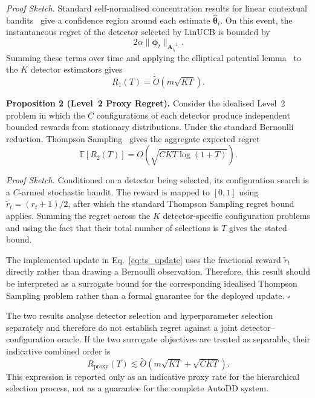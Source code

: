 \documentclass[conference]{IEEEtran}
\begin{document}
\textit{Proof Sketch.}
Standard self-normalised concentration results for linear contextual bandits~\cite{Abbasi2011Improved} give a confidence region around each estimate $\hat{\boldsymbol{\theta}}_i$. On this event, the instantaneous regret of the detector selected by LinUCB is bounded by
\begin{equation}
2\alpha
\|\boldsymbol{\phi}_t\|_{\mathbf{A}_{i_t}^{-1}}.
\end{equation}
Summing these terms over time and applying the elliptical potential lemma~\cite{Dani2008Stochastic} to the $K$ detector estimators gives
\begin{equation}
R_1(T)
=
\tilde{O}\!\left(m\sqrt{KT}\right).
\tag*{$\square$}
\end{equation}


\textbf{Proposition 2 (Level~2 Proxy Regret).}
Consider the idealised Level~2 problem in which the $C$ configurations of each detector produce independent bounded rewards from stationary distributions. Under the standard Bernoulli reduction, Thompson Sampling~\cite{Agrawal2013Further} gives the aggregate expected regret
\begin{equation}
\mathbb{E}[R_2(T)]
=
O\!\left(
\sqrt{CKT\log(1+T)}
\right).
\end{equation}

\textit{Proof Sketch.}
Conditioned on a detector being selected, its configuration search is a $C$-armed stochastic bandit. The reward is mapped to $[0,1]$ using
$\tilde{r}_t=(r_t+1)/2$, after which the standard Thompson Sampling regret bound applies. Summing the regret across the $K$ detector-specific configuration problems and using the fact that their total number of selections is $T$ gives the stated bound.

The implemented update in Eq.~\eqref{eq:ts_update} uses the fractional reward $\tilde{r}_t$ directly rather than drawing a Bernoulli observation. Therefore, this result should be interpreted as a surrogate bound for the corresponding idealised Thompson Sampling problem rather than a formal guarantee for the deployed update.
\hfill $\square$


The two results analyse detector selection and hyperparameter selection separately and therefore do not establish regret against a joint detector--configuration oracle. If the two surrogate objectives are treated as separable, their indicative combined order is
\begin{equation}
R_{\mathrm{proxy}}(T)
\lesssim
\tilde{O}\!\left(
m\sqrt{KT}
+
\sqrt{CKT}
\right).
\end{equation}
This expression is reported only as an indicative proxy rate for the hierarchical selection process, not as a guarantee for the complete AutoDD system.
\end{document}
